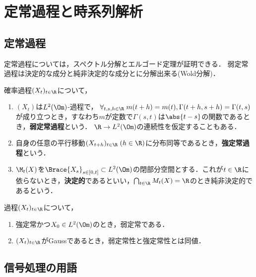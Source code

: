 \documentclass[uplatex,dvipdfmx]{jsreport}
\begin{document}
\chapter{定常過程と時系列解析}



\section{定常過程}

\begin{tcolorbox}[colframe=ForestGreen, colback=ForestGreen!10!white,breakable,colbacktitle=ForestGreen!40!white,coltitle=black,fonttitle=\bfseries\sffamily,
title=]
    定常過程については，スペクトル分解とエルゴード定理が証明できる．
    弱定常過程は決定的な成分と純非決定的な成分とに分解出来る(Wold分解)．
\end{tcolorbox}

\begin{definition}
    確率過程$(X_t)_{t\in\R}$について，
    \begin{enumerate}
        \item $(X_t)$は$L^2(\Om)$-過程で，
        $\forall_{t,s,h\in\R}\;m(t+h)=m(t),\Gamma(t+h,s+h)=\Gamma(t,s)$が成り立つとき，すなわち$m$が定数で$\Gamma(s,t)$は$\abs{t-s}$の関数であるとき，\textbf{弱定常過程}という．
        $\R\to L^2(\Om)$の連続性を仮定することもある．
        \item 自身の任意の平行移動$(X_{t+h})_{t\in\R}\;(h\in\R)$に分布同等であるとき，\textbf{強定常過程}という．
        \item $\M_t(X)$を$\Brace{X_s}_{s\in[0,t]}\subset L^2(\Om)$の閉部分空間とする．これが$t\in\R$に依らないとき，\textbf{決定的}であるといい，$\bigcap_{t\in\R}M_t(X)=\R$のとき純非決定的であるという．
    \end{enumerate}
\end{definition}

\begin{lemma}
    過程$(X_t)_{t\in\R}$について，
    \begin{enumerate}
        \item 強定常かつ$X_0\in L^2(\Om)$のとき，弱定常である．
        \item $(X_t)_{t\in\R}$がGaussであるとき，弱定常性と強定常性とは同値．
    \end{enumerate}
\end{lemma}

\section{信号処理の用語}
\end{document}
